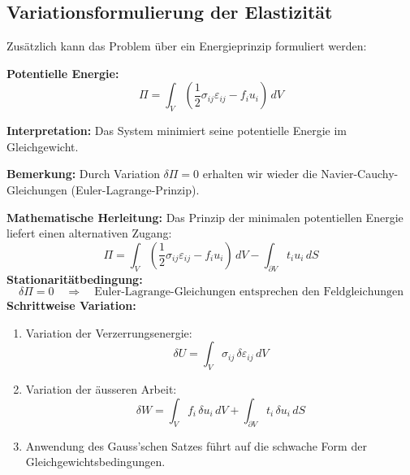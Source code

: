 \subsection{Variationsformulierung der Elastizität}
Zusätzlich kann das Problem über ein Energieprinzip formuliert werden:

\textbf{Potentielle Energie:}
	\begin{equation}
		\Pi = 
		\int_V \left( \frac{1}{2} \sigma_{ij} \varepsilon_{ij} - f_i u_i \right) \, dV
	\end{equation}
	
\textbf{Interpretation:} Das System minimiert seine potentielle Energie im Gleichgewicht.

\textbf{Bemerkung:} Durch Variation $\delta \Pi = 0$ erhalten wir wieder die Navier-Cauchy-Gleichungen (Euler-Lagrange-Prinzip).

\bigskip

\textbf{Mathematische Herleitung:}
Das Prinzip der minimalen potentiellen Energie liefert einen alternativen Zugang:
	\begin{equation}
		\Pi = 
		\int_V \left( \frac{1}{2} \sigma_{ij} \varepsilon_{ij} - f_i u_i \right) \, dV - \int_{\partial V} 	t_i u_i \, dS
	\end{equation}
\textbf{Stationaritätbedingung:}
	\begin{equation}
		\delta \Pi = 
		0 \quad \Rightarrow \quad \text{Euler-Lagrange-Gleichungen entsprechen den Feldgleichungen}
	\end{equation}
\textbf{Schrittweise Variation:}
\begin{enumerate}
	\item Variation der Verzerrungsenergie:
	\begin{equation}
		\delta U = 
		\int_V \sigma_{ij} \, \delta \varepsilon_{ij} \, dV
	\end{equation}
	
	\item Variation der äusseren Arbeit:
	\begin{equation}
		\delta W = 
		\int_V f_i \, \delta u_i \, dV + \int_{\partial V} t_i \, \delta u_i \, dS
	\end{equation}
	
	\item Anwendung des Gauss'schen Satzes führt auf die schwache Form der Gleichgewichtsbedingungen.
\end{enumerate}

